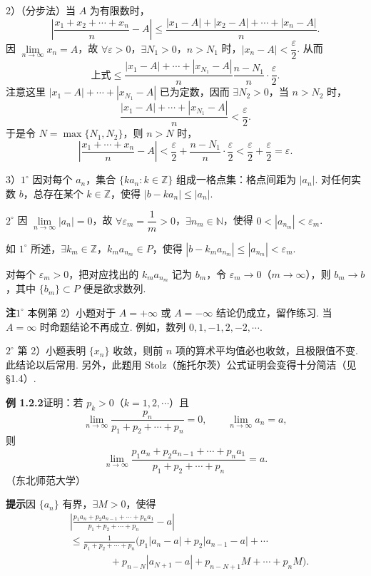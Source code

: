 \documentclass[UTF8, 12pt, fontset=fandol, oneside]{ctexart}
\begin{document}
2）（分步法）当 $A$ 为有限数时，
\[
  \left|\frac{x_1+x_2+\cdots+x_n}{n}-A\right|
  \le\frac{|x_1-A|+|x_2-A|+\cdots+|x_n-A|}{n}.
\]
因 $\lim\limits_{n\to\infty}x_n=A$，故 $\forall\varepsilon>0$，$\exists N_1>0$，$n>N_1$ 时，$|x_n-A|<\dfrac\varepsilon2$. 从而
\[
\text{上式}\le
\frac{|x_1-A|+\cdots+|x_{N_1}-A|}{n}
\frac{n-N_1}{n}\cdot\frac\varepsilon2.
\]
注意这里 $|x_1-A|+\cdots+|x_{N_1}-A|$ 已为定数，因而 $\exists N_2>0$，当 $n>N_2$ 时，
\[
  \frac{|x_1-A|+\cdots+|x_{N_1}-A|}{n}<\frac\varepsilon2.
\]
于是令 $N=\max\{N_1,N_2\}$，则 $n>N$ 时，
\[
  \left|\frac{x_1+\cdots+x_n}{n}-A\right|
  <\frac\varepsilon2+\frac{n-N_1}{n}\cdot\frac\varepsilon2<\frac\varepsilon2+\frac\varepsilon2=\varepsilon.
\]

3）$1^\circ$ 因对每个 $a_n$，集合 $\{ka_n:k\in\mathbb{Z}\}$ 组成一格点集：格点间距为 $|a_n|$. 对任何实数 $b$，总存在某个 $k\in\mathbb{Z}$，使得 $|b-ka_n|\le |a_n|$.

$2^\circ$ 因 $\lim\limits_{n\to\infty}|a_n|=0$，故 $\forall\varepsilon_m=\dfrac1m>0$，$\exists n_m\in\mathbb{N}$，使得 $0<|a_{n_m}|<\varepsilon_m$.

如 $1^\circ$ 所述，$\exists k_m\in\mathbb{Z}$，$k_ma_{n_m}\in P$，使得 $|b-k_ma_{n_m}|\le |a_{n_m}|<\varepsilon_m$.

对每个 $\varepsilon_m>0$，把对应找出的 $k_ma_{n_m}$ 记为 $b_m$，令 $\varepsilon_m\to0$（$m\to\infty$），则 $b_m\to b$，其中 $\{b_m\}\subset P$ 便是欲求数列.

\noindent\textbf{注}\quad $1^\circ$ 本例第 2）小题对于 $A=+\infty$ 或 $A=-\infty$ 结论仍成立，留作练习. 当 $A=\infty$ 时命题结论不再成立. 例如，数列 $0,1,-1,2,-2,\cdots$.

$2^\circ$ 第 2）小题表明 $\{x_n\}$ 收敛，则前 $n$ 项的算术平均值必也收敛，且极限值不变. 此结论以后常用. 另外，此题用 Stolz（施托尔茨）公式证明会变得十分简洁（见 §1.4）.

\noindent\textbf{例 1.2.2}\quad 证明：若 $p_k>0$（$k=1,2,\cdots$）且
\[
  \lim_{n\to\infty}\frac{p_n}{p_1+p_2+\cdots+p_n}=0,\qquad
  \lim_{n\to\infty}a_n=a,
\]
则
\[
  \lim_{n\to\infty}\frac{p_1a_n+p_2a_{n-1}+\cdots+p_na_1}{p_1+p_2+\cdots+p_n}=a.
\]
（东北师范大学）

\noindent\textbf{提示}\quad 因 $\{a_n\}$ 有界，$\exists M>0$，使得
\[
\begin{aligned}
&\left|\frac{p_1a_n+p_2a_{n-1}+\cdots+p_na_1}{p_1+p_2+\cdots+p_n}-a\right|\\
&\le \frac1{p_1+p_2+\cdots+p_n}
\bigl(p_1|a_n-a|+p_2|a_{n-1}-a|+\cdots\\
&\qquad\qquad +p_{n-N}|a_{N+1}-a|+p_{n-N+1}M+\cdots+p_nM\bigr).
\end{aligned}
\]
\end{document}
